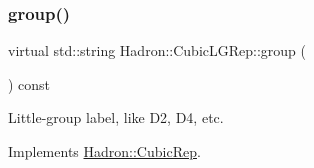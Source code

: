 \mbox{\label{structHadron_1_1CubicLGRep_a9bdb14b519a611d21379ed96a3a9eb41}} 
\subsubsection{\texorpdfstring{group()}{group()}\hspace{0.1cm}{\footnotesize\ttfamily [2/2]}}
{\footnotesize\ttfamily virtual std\+::string Hadron\+::\+Cubic\+L\+G\+Rep\+::group (\begin{DoxyParamCaption}{ }\end{DoxyParamCaption}) const\hspace{0.3cm}{\ttfamily [pure virtual]}}

Little-\/group label, like D2, D4, etc. 

Implements \mbox{\hyperlink{structHadron_1_1CubicRep_a0748f11ec87f387062c8e8981339a29c}{Hadron\+::\+Cubic\+Rep}}.



